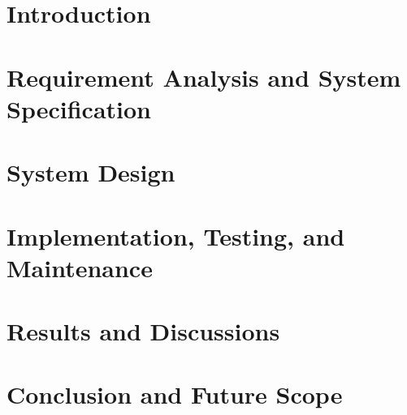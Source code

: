 \documentclass[12pt]{report}
\begin{document}




\footskip 0.7cm
\thispagestyle{empty} 
\pagetitle
\newpage
{}
\cfoot{\thepage}



\newpage
\tableofcontents
\newpage
\listoffigures
\newpage
\listoftables

\cfoot{\thepage}

\newpage

\chapter{Introduction}

\chapter{Requirement Analysis and System Specification}

\chapter{System Design}

\chapter{Implementation, Testing, and Maintenance}

\chapter{Results and Discussions}

\chapter{Conclusion and Future Scope }

\newpage


\end{document}
